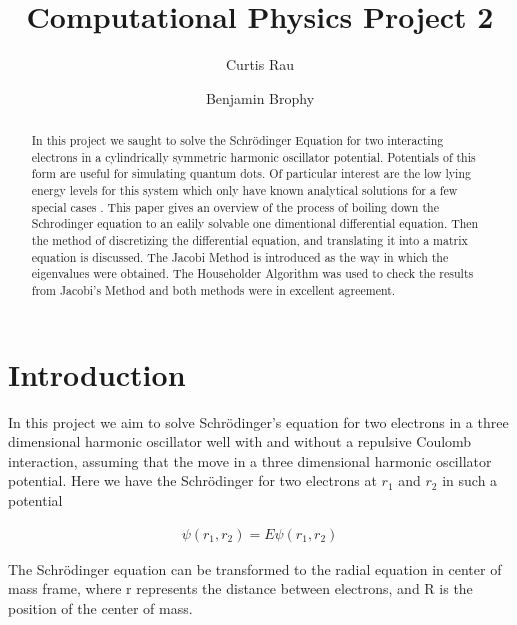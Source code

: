 \documentclass[twocolumn, groupedaddress]{revtex4-1}
\begin{document}
\author{Curtis Rau}
\author{Benjamin Brophy}
\title{Computational Physics Project 2}

\begin{abstract}
In this project we saught to solve the Schr\"{o}dinger Equation for two interacting electrons in a cylindrically symmetric harmonic oscillator potential.  Potentials of this form are useful for simulating quantum dots.  Of particular interest are the low lying energy levels for this system which only have known analytical solutions for a few special cases \cite{taut}.  This paper gives an overview of the process of boiling down the Schrodinger equation to an ealily solvable one dimentional differential equation.  Then the method of discretizing the differential equation, and translating it into a matrix equation is discussed.  The Jacobi Method is introduced as the way in which the eigenvalues were obtained.  The Householder Algorithm was used to check the results from Jacobi's Method and both methods were in excellent agreement.
\end{abstract}

\maketitle


\section{Introduction}

In this project we aim to solve Schr\"{o}dinger's equation for two electrons in a three dimensional harmonic oscillator well with and without a repulsive Coulomb interaction, assuming that the move in a three dimensional harmonic oscillator potential. Here we have the Schr\"odinger for two electrons at $r_1$ and $r_2$ in such a potential

\begin{align}
[- \frac{\hbar^2}{2m} \left( \nabla_1^2 + \nabla_2^2 \right)				\nonumber
		+ \frac{1}{2}m\omega^2 \left( r_1^2 + r_2^2 \right)				\\
		+ \frac{ke^2}{|r_1^2-r_2^2|}
		]
		\psi (r_1,r_2)  = E \psi (r_1,r_2)
\end{align}


The Schr\"{o}dinger equation can be transformed to the radial equation in center of mass frame, where r represents the distance between electrons, and R is the position of the center of mass.
\end{document}

